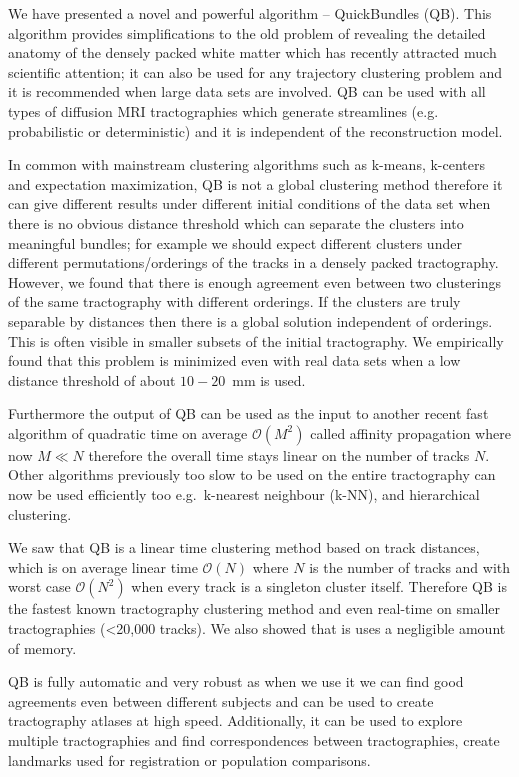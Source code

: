 \documentclass[journal]{IEEEtran}
\begin{document}
We have presented a novel and powerful algorithm -- QuickBundles
(QB). This algorithm provides simplifications to the old problem of
revealing the detailed anatomy of the densely packed white matter which
has recently attracted much scientific attention; it can also be used
for any trajectory clustering problem and it is recommended when large
data sets are involved. QB can be used with all types of diffusion MRI
tractographies which generate streamlines (e.g. probabilistic or
deterministic) and it is independent of the reconstruction model.

In common with mainstream clustering algorithms such as k-means,
k-centers and expectation maximization, QB is not a global clustering
method therefore it can give different results under different initial
conditions of the data set when there is no obvious distance threshold
which can separate the clusters into meaningful bundles; for example we
should expect different clusters under different permutations/orderings
of the tracks in a densely packed tractography. However, we found that
there is enough agreement even between two clusterings of the same
tractography with different orderings. If the clusters are truly
separable by distances then there is a global solution independent of
orderings. This is often visible in smaller subsets of the initial
tractography. We empirically found that this problem is minimized even
with real data sets when a low distance threshold of about $10-20$~mm is
used.

Furthermore the output of QB can be used as the input to another recent
fast algorithm of quadratic time on average $\mathcal{O}(M^{2})$ called affinity
propagation where now $M\ll N$ therefore the overall time stays linear
on the number of tracks $N$. Other algorithms previously too slow to be
used on the entire tractography can now be used efficiently too
e.g.~k-nearest neighbour (k-NN), and hierarchical clustering.

We saw that QB is a linear time clustering method based on track
distances, which is on average linear time $\mathcal{O}(N)$ where $N$ is
the number of tracks and with worst case $\mathcal{O}(N^{2})$ when every
track is a singleton cluster itself. Therefore QB is the fastest known
tractography clustering method and even real-time on smaller
tractographies (<20,000 tracks). We also showed that is uses a negligible amount of
memory.

QB is fully automatic and very robust as when we use it we can find good
agreements even between different subjects and can be used to create
tractography atlases at high speed. Additionally, it can be used to
explore multiple tractographies and find correspondences between
tractographies, create landmarks used for registration or population
comparisons.
\end{document}
